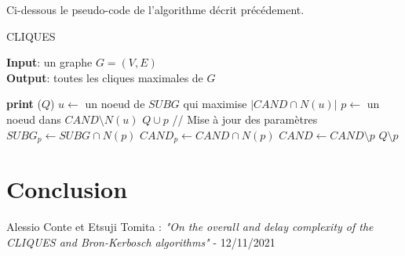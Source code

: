 \documentclass[a4paper, 12pt]{article}
\begin{document}
Ci-dessous le pseudo-code de l'algorithme décrit précédement.
\begin{algorithm}
  \caption{CLIQUES}
  \textbf{Input}: un graphe $G = (V,E)$\\
  \textbf{Output}: toutes les cliques maximales de $G$
  \begin{algorithmic}[1]
       
        \State \textbf{print} ($ Q $)
      \Else
        \State $u \gets$ un noeud de $SUBG$ qui maximise $|CAND \cap N(u)|$
          \State $p \gets$ un noeud dans $CAND \setminus N(u)$
          \State $ Q \cup p $ 
          \State // Mise à jour des paramètres
          \State $SUBG_p \gets SUBG \cap N(p)$
          \State $CAND_p \gets CAND \cap N(p)$
          \State {}
          \State $CAND \gets CAND \setminus {p}$
          \State $ Q \setminus p $ 
        \EndWhile
      \EndIf
    \EndProcedure
    \State {}
  \end{algorithmic}
\end{algorithm}

\section{Conclusion}


\newpage
\begin{thebibliography}{unsrt}
 Alessio Conte et Etsuji Tomita :  \textit{"On the overall and delay complexity of the CLIQUES and Bron-Kerbosch algorithms"} -  12/11/2021
\end{thebibliography}
\end{document}
